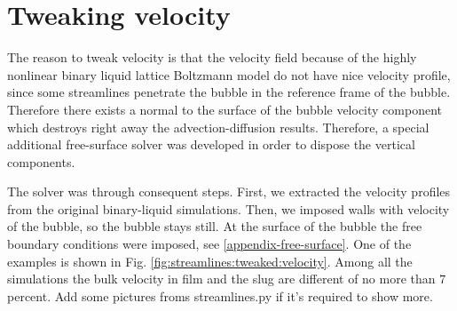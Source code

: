 \documentclass{article}
\begin{document}
\section{Tweaking velocity}
The reason to tweak velocity is that the velocity field because of the highly nonlinear binary liquid lattice Boltzmann model do not have nice velocity profile, since some streamlines penetrate the bubble in the reference frame of the bubble. Therefore there exists a normal to the surface of the bubble velocity component which destroys right away the advection-diffusion results. Therefore, a special additional free-surface solver was developed in order to dispose the vertical components. 

The solver was through consequent steps. First, we extracted the velocity profiles from the
original binary-liquid simulations. Then, we imposed walls with velocity of the bubble, so the
bubble stays still. At the surface of the bubble the free boundary conditions were imposed, see
\ref{appendix-free-surface}. One of the examples is shown in Fig.
\ref{fig:streamlines:tweaked:velocity}. Among all the simulations the bulk velocity in film and the
slug are different of no more than $7$ percent. {\color{red} Add some pictures froms streamlines.py
if it's required to show more.}
\end{document}
